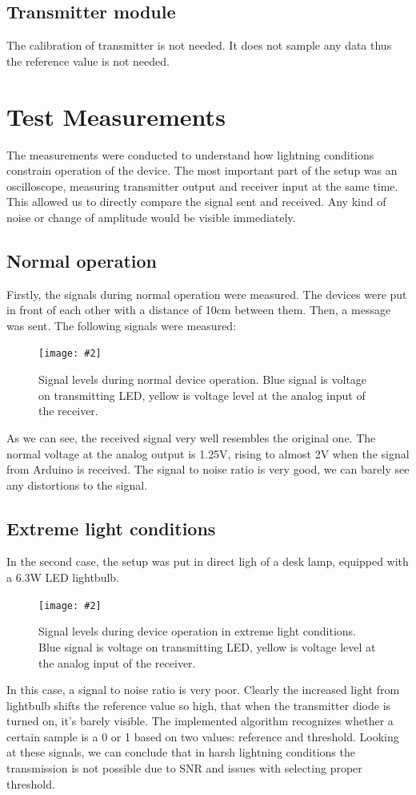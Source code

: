 \documentclass[12pt]{article}
\newcommand{\image}[3]{
\begin{figure}[h]
	\begin{center}
		\texttt{[image: \#2]}
	\end{center}
  \caption{#1}
\end{figure}}
\begin{document}
  \subsection{Transmitter module}
  The calibration of transmitter is not needed. It does not sample any data thus the reference value is not needed.
	\newpage
	\section{Test Measurements}
  The measurements were conducted to understand how lightning conditions constrain operation of the device. The most important part of the setup was 
  an oscilloscope, measuring transmitter output and receiver input at the same time. This allowed us to directly compare the signal sent and received.
  Any kind of noise or change of amplitude would be visible immediately.

  \subsection{Normal operation}
  Firstly, the signals during normal operation were measured. The devices were put in front of each other with a distance of 10cm between them.
  Then, a message was sent. The following signals were measured:
  \image{Signal levels during normal device operation. Blue signal is voltage on transmitting LED, yellow is voltage level at the analog input of the receiver.}{normal.png}{0.5}
  As we can see, the received signal very well resembles the original one. The normal voltage at the analog output is 1.25V, rising to almost 2V when the signal from Arduino is received.
  The signal to noise ratio is very good, we can barely see any distortions to the signal.

  
  \newpage
  \subsection{Extreme light conditions}
  In the second case, the setup was put in direct ligh of a desk lamp, equipped with a 6.3W LED lightbulb.
  \image{Signal levels during device operation in extreme light conditions. Blue signal is voltage on transmitting LED, yellow is voltage level at the analog input of the receiver.}{noise.png}{0.5}
  In this case, a signal to noise ratio is very poor. Clearly the increased light from lightbulb shifts the reference value so high, that 
  when the transmitter diode is turned on, it's barely visible.
  The implemented algorithm recognizes whether a certain sample is a 0 or 1 based on two values: reference and threshold.
  Looking at these signals, we can conclude that in harsh lightning conditions the transmission is not possible due to SNR and issues with selecting proper threshold.
\end{document}
